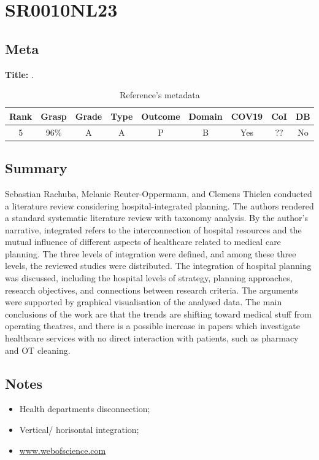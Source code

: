 \section{ SR0010NL23 }


\subsection{Meta}

    \textbf{Title:}
    .

    \begin{table}[H]
        \centering
        \begin{tabular}{|c|c|c|c|c|c|c|c|c|}
            \hline
                \textbf{Rank} & \textbf{Grasp} & \textbf{Grade} & \textbf{Type} & \textbf{Outcome} & \textbf{Domain} & \textbf{COV19} & \textbf{CoI} & \textbf{DB} \\
            \hline
                5 & 96\% & A & A & P & B & Yes & ?? & No \\
            \hline
        \end{tabular}
        \caption{Reference's metadata}
        \label{tab:SR0010NL23}
    \end{table}

\subsection{Summary}
    Sebastian Rachuba, Melanie Reuter-Oppermann, and Clemens Thielen conducted a literature review considering hospital-integrated planning. The authors rendered a standard systematic literature review with taxonomy analysis. By the author's narrative, integrated refers to the interconnection of hospital resources and the mutual influence of different aspects of healthcare related to medical care planning. The three levels of integration were defined, and among these three levels, the reviewed studies were distributed. The integration of hospital planning was discussed, including the hospital levels of strategy, planning approaches, research objectives, and connections between research criteria. The arguments were supported by graphical visualisation of the analysed data. The main conclusions of the work are that the trends are shifting toward medical stuff from operating theatres, and there is a possible increase in papers which investigate healthcare services with no direct interaction with patients, such as pharmacy and OT cleaning. 
    

\subsection{Notes}
    \begin{itemize}
        \item Health departments disconnection;
        \item Vertical/ horisontal integration;
        \item \url{www.webofscience.com}
    \end{itemize}


